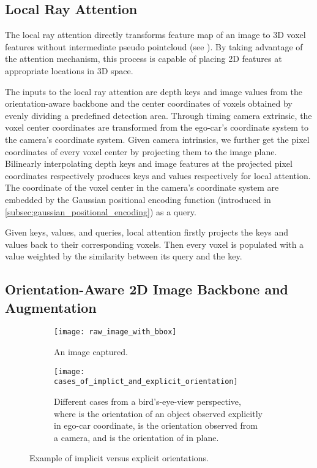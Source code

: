 \documentclass[10pt,twocolumn,letterpaper]{article}
\begin{document}
\subsection{Local Ray Attention}
The local ray attention directly transforms feature map of an image to 3D voxel features without intermediate pseudo pointcloud (see ). By taking advantage of the attention mechanism, this process is capable of placing 2D features at appropriate locations in 3D space.

The inputs to the local ray attention are depth keys and image values from the orientation-aware backbone and the center coordinates of voxels obtained by evenly dividing a predefined detection area. Through timing camera extrinsic, the voxel center coordinates are transformed from the ego-car's coordinate system to the camera's coordinate system. Given camera intrinsics, we further get the pixel coordinates of every voxel center by projecting them to the image plane. Bilinearly interpolating depth keys and image features at the projected pixel coordinates respectively produces keys and values respectively for local attention. The  coordinate of the voxel center in the camera's coordinate system are embedded by the Gaussian positional encoding function (introduced in \cref{subsec:gaussian_positional_encoding}) as a query.

Given keys, values, and queries, local attention firstly projects the keys and values back to their corresponding voxels. Then every voxel is populated with a value weighted by the similarity between its query and the key.



\subsection{Orientation-Aware 2D Image Backbone and Augmentation}
\label{subsec:orientation_aware}
\begin{figure}
  \centering
  \begin{subfigure}{8cm}
    \texttt{[image: raw\_image\_with\_bbox]}
    \caption{An image captured.}
    \label{fig:orientation_aware_raw_image}
  \end{subfigure}
  \hspace{0.5cm}
  \begin{subfigure}{8cm}
    \texttt{[image: cases\_of\_implict\_and\_explicit\_orientation]}
    \caption{Different cases from a bird's-eye-view perspective, where  is the orientation of an object observed explicitly in ego-car coordinate,  is the orientation observed from a camera, and  is the orientation of  in  plane.}
    \label{fig:orientation_aware_cases}
  \end{subfigure}
  \caption{Example of implicit versus explicit orientations.}
  \label{fig:orientation_aware}
\end{figure}
\end{document}
